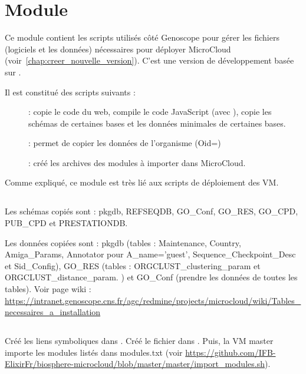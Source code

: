 \chapter{Module \micWEBdeployVer} \label{chap:micwebdeploy}

Ce module contient les scripts utilisés côté Genoscope pour gérer les fichiers (logiciels et les données) nécessaires pour déployer MicroCloud (voir~\autoref{chap:creer_nouvelle_version}).
C'est une version de développement basée sur .

Il est constitué des scripts suivants :
\begin{description}
    \item[] : copie le code du web, compile le code JavaScript (avec ), copie les schémas de certaines bases et les données minimales de certaines bases.
    \item[] : permet de copier les données de l'organisme \theOrg{} (Oid=\theOid)
    \item[]: créé les archives des modules à importer dans MicroCloud.
\end{description}

Comme expliqué, ce module est très lié aux scripts de déploiement des VM.

\section{}

Les schémas copiés sont : pkgdb, REFSEQDB, GO\_Conf, GO\_RES, GO\_CPD, PUB\_CPD et PRESTATIONDB.

Les données copiées sont : pkgdb (tables : Maintenance, Country, Amiga\_Params,
Annotator pour A\_name='guest', Sequence\_Checkpoint\_Desc et Sid\_Config), GO\_RES (tables : ORGCLUST\_clustering\_param et ORGCLUST\_distance\_param.
) et GO\_Conf (prendre les données de toutes les tables). Voir page wiki : \url{https://intranet.genoscope.cns.fr/agc/redmine/projects/microcloud/wiki/Tables_necessaires_a_installation}


\section{}

Créé les liens symboliques dans .
Créé le fichier  dans .
Puis, la VM master importe les modules listés dans modules.txt (voir \url{https://github.com/IFB-ElixirFr/biosphere-microcloud/blob/master/master/import_modules.sh}).

